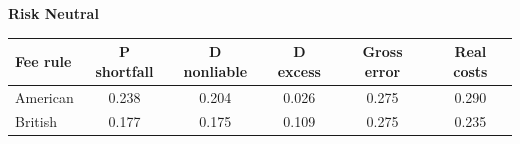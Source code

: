 \documentclass[10pt,border=5pt,varwidth=17cm]{standalone}
\begin{document}
\begingroup
\small
\setlength{\tabcolsep}{5pt}
\renewcommand{\arraystretch}{1.20}
\noindent\textbf{Risk Neutral}\par\smallskip
\noindent\begin{tabularx}{\linewidth}{@{}>{\raggedright\arraybackslash}Xccccc@{}}
\toprule
\textbf{Fee rule} & \textbf{P shortfall} & \textbf{D nonliable} & \textbf{D excess} & \textbf{Gross error} & \textbf{Real costs} \\
\midrule
American & 0.238 & 0.204 & 0.026 & 0.275 & 0.290 \\
British & 0.177 & 0.175 & 0.109 & 0.275 & 0.235 \\
\bottomrule\end{tabularx}\par\medskip
\endgroup
\end{document}
